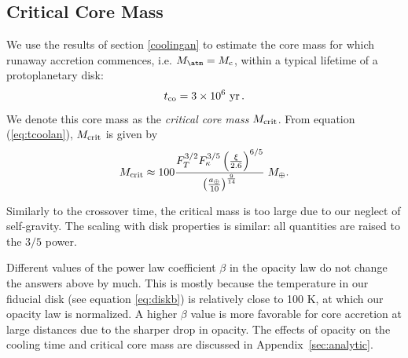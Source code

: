 \documentclass[apj]{emulateapj}
\newcommand{\App}[1]{Appendix~\ref{#1}}
\newcommand{\co}{_{\rm c}}
\newcommand{\au}{a_\oplus}
\begin{document}
\subsection{Critical Core Mass}\label{sec:critmass}

We use the results of section \ref{coolingan} to estimate the core mass for which  runaway accretion commences, i.e. $M_{\atm}=M\co$, within a typical lifetime of a protoplanetary disk: 
\begin{equation}
t_{\rm co} = 3 \times 10^6 ~{\rm yr} \,.
\end{equation} 
We denote this core mass as the \textit{critical core mass} $M_{\rm crit}$. From equation (\ref{eq:tcoolan}), $M_{\rm{crit}}$ is given by
\begin{equation}\label{eq:Mcrit}
M_{\rm crit} \approx 100 {F_T^{3/2} F_\kappa^{3/5}   \left(\xi \over 2.6 \right)^{6/5} \over \left(\au \over 10\right)^{9 \over 14}} \; M_\oplus.
\end{equation} 

Similarly to the crossover time, the critical mass is too large due to our neglect of self-gravity.  The scaling with disk properties is similar: all quantities are raised to the $3/5$ power.  


Different values of the power law coefficient $\beta$ in the opacity law do not change the answers above by much.  This is mostly because the temperature in our fiducial disk (see equation \ref{eq:diskb}) is relatively close to 100 K, at which our opacity law is normalized. A higher $\beta$ value is more favorable for core accretion at large distances due to the sharper drop in opacity. The effects of opacity on the cooling time and critical core mass are discussed in \App{sec:analytic}.
\end{document}
